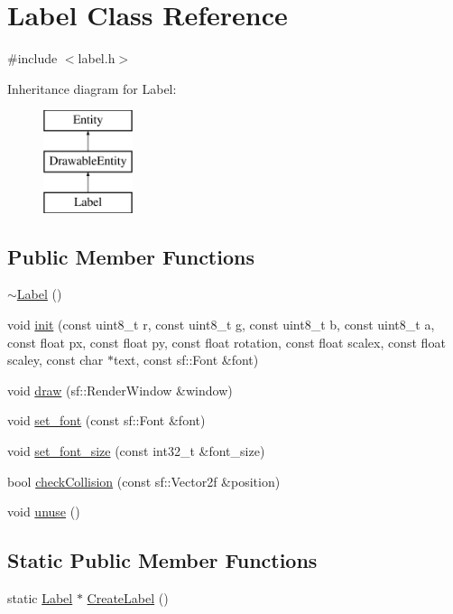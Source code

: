 \hypertarget{class_label}{}\section{Label Class Reference}
\label{class_label}


{\ttfamily \#include $<$label.\+h$>$}

Inheritance diagram for Label\+:\begin{figure}[H]
\begin{center}
\leavevmode
\includegraphics[height=3.000000cm]{class_label}
\end{center}
\end{figure}
\subsection*{Public Member Functions}
\begin{DoxyCompactItemize}
\item 
\hyperlink{class_label_a39e1167a9b5827afd888780973d88894}{$\sim$\+Label} ()
\item 
void \hyperlink{class_label_ab69dd0268124ac21d55b87734fd282a0}{init} (const uint8\+\_\+t r, const uint8\+\_\+t g, const uint8\+\_\+t b, const uint8\+\_\+t a, const float px, const float py, const float rotation, const float scalex, const float scaley, const char $\ast$text, const sf\+::\+Font \&font)
\item 
void \hyperlink{class_label_acaf5dfeeab3e46b5795b8cd24c9d94fe}{draw} (sf\+::\+Render\+Window \&window)
\item 
void \hyperlink{class_label_affe136b0a2e4a2240ecd30460222811d}{set\+\_\+font} (const sf\+::\+Font \&font)
\item 
void \hyperlink{class_label_a9e794358a782f0a4ba163bcbbe013612}{set\+\_\+font\+\_\+size} (const int32\+\_\+t \&font\+\_\+size)
\item 
bool \hyperlink{class_label_ad79f141fe2f04fd095b9507cac2667a6}{check\+Collision} (const sf\+::\+Vector2f \&position)
\item 
void \hyperlink{class_label_abafe12b2237df6f7e915d407d8084ec7}{unuse} ()
\end{DoxyCompactItemize}
\subsection*{Static Public Member Functions}
\begin{DoxyCompactItemize}
\item 
static \hyperlink{class_label}{Label} $\ast$ \hyperlink{class_label_a9331db7ea12bb0bfa69910b9aa2229a4}{Create\+Label} ()
\end{DoxyCompactItemize}
